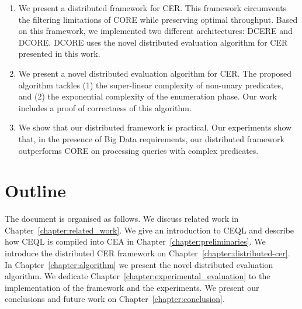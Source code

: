 \begin{enumerate}[label=(\roman*)]
  \item We present a distributed framework for CER. This framework circumvents the filtering limitations of CORE while preserving optimal throughput. Based on this framework, we implemented two different architectures: DCERE and DCORE. DCORE uses the novel distributed evaluation algorithm for CER presented in this work.

  \item We present a novel distributed evaluation algorithm for CER. The proposed algorithm tackles (1) the super-linear complexity of non-unary predicates, and (2) the exponential complexity of the enumeration phase. Our work includes a proof of correctness of this algorithm.

  \item We show that our distributed framework is practical. Our experiments show that, in the presence of Big Data requirements, our distributed framework outperforms CORE on processing queries with complex predicates.
\end{enumerate}

\section{Outline}
\label{sec:outline}

The document is organised as follows. We discuss related work in Chapter~\ref{chapter:related_work}. We give an introduction to CEQL and describe how CEQL is compiled into CEA in Chapter~\ref{chapter:preliminaries}. We introduce the distributed CER framework on Chapter~\ref{chapter:distributed-cer}. In Chapter~\ref{chapter:algorithm} we present the novel distributed evaluation algorithm. We dedicate Chapter~\ref{chapter:experimental_evaluation} to the implementation of the framework and the experiments. We present our conclusions and future work on Chapter~\ref{chapter:conclusion}.
